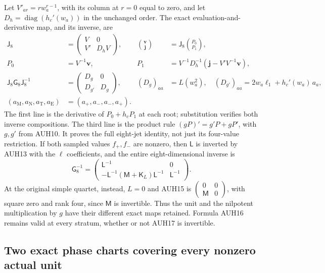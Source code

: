 \documentclass[11pt]{article}
\begin{document}
Let $V'_{ar}=r w_a^{r-1}$, with its column at $r=0$ equal to zero,
and let $D_h=\operatorname{diag}(h_c'(w_a))$ in the unchanged order.
The exact evaluation-and-derivative map, and its inverse, are
\[
\begin{aligned}
 \mathsf J_8&=\begin{pmatrix}V&0\\V'&D_hV\end{pmatrix},&
 \binom{\mathbf v}{\mathbf j}&=\mathsf J_8\binom{P_0}{P_1},\\
 P_0&=V^{-1}\mathbf v,&
 P_1&=V^{-1}D_h^{-1}(\mathbf j-V'V^{-1}\mathbf v),\\
 \mathsf J_8\mathsf G_8\mathsf J_8^{-1}
 &=\begin{pmatrix}D_g&0\\D_{g'}&D_g\end{pmatrix},&
 (D_g)_{aa}&=L(w_a^2),\quad
 (D_{g'})_{aa}=2w_a\ell_1+h_c'(w_a)\,a_a,\\
 (a_{\mathrm M},a_{\mathrm N},a_{\mathrm T},a_{\mathrm E})
 &=(a_+,a_-,a_-,a_+).
\end{aligned}\tag{AUH16}
\]
The first line is the derivative of $P_0+h_cP_1$ at each root;
substitution verifies both inverse compositions.  The third line
is the product rule $(gP)'=g'P+gP'$, with $g,g'$ from AUH10.
It proves the full eight-jet identity, not just its four-value
restriction.  If both sampled values $f_+,f_-$ are nonzero, then
$\mathsf L$ is inverted by AUH13 with the $\ell$ coefficients,
and the entire eight-dimensional inverse is
\[
 \mathsf G_8^{-1}=
 \begin{pmatrix}
 \mathsf L^{-1}&0\\
 -\mathsf L^{-1}(\mathsf M+\mathsf K_L)\mathsf L^{-1}&\mathsf L^{-1}
 \end{pmatrix}.
 \tag{AUH17}
\]
At the original simple quartet, instead, $L=0$ and AUH15 is
$\left(\begin{smallmatrix}0&0\\\mathsf M&0\end{smallmatrix}\right)$,
with square zero and rank four, since $\mathsf M$ is invertible.
Thus the unit and the nilpotent multiplication by $g$ have their
different exact maps retained.  Formula AUH16 remains valid at
every stratum, whether or not AUH17 is invertible.

\subsection{Two exact phase charts covering every nonzero actual unit}
\end{document}
